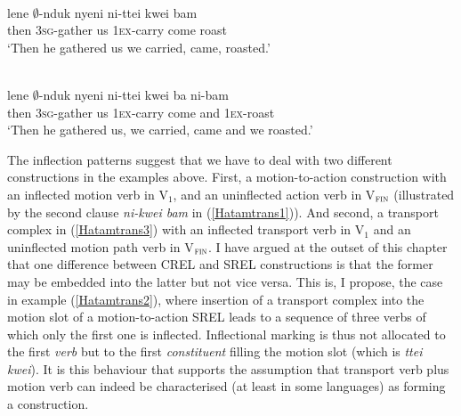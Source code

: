 \ea \label{Hatamtrans2}
\\
\gll lene $\emptyset$-nduk nyeni ni-ttei kwei bam \\ 
then \textsc{3}\textsc{sg}-gather us \textsc{1}\textsc{ex}-carry come roast \\
\glft `Then he gathered us we carried, came, roasted.' \\ 
\z

\ea \label{Hatamtrans3}
\\
\gll lene $\emptyset$-nduk nyeni ni-ttei kwei ba ni-bam \\ 
then \textsc{3}\textsc{sg}-gather us \textsc{1}\textsc{ex}-carry come and \textsc{1}\textsc{ex}-roast \\
\glft `Then he gathered us, we carried, came and we roasted.'\\ 
\z

The inflection patterns suggest that we have to deal with two different constructions in the  examples above. First, a motion-to-action construction with an inflected motion verb in V$_{1}$, and an uninflected action verb in V$_{\textsc{fin}}$ (illustrated by the second clause \textit{ni-kwei bam} in (\ref{Hatamtrans1})). And second, a transport complex in (\ref{Hatamtrans3}) with an inflected transport verb in V$_{1}$ and an uninflected motion path verb in V$_{\textsc{fin}}$. I have argued at the outset of this chapter that one difference between CREL and SREL constructions is that the former may be embedded into the latter but not vice versa. This is, I propose, the case in example (\ref{Hatamtrans2}), where insertion of a transport complex into the motion slot of a motion-to-action SREL leads to a sequence of three verbs of which only the first one is inflected. Inflectional marking is thus not allocated to the first \emph{verb} but to the first \emph{constituent} filling the motion slot (which is \textit{ttei kwei}). It is this behaviour that supports the assumption that transport verb plus motion verb can indeed be characterised (at least in some languages) as forming a construction.

